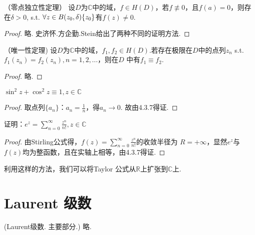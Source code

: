 \begin{mypro}\color{blue}（零点独立性定理）
	\color{black}
	设$\displaystyle{D}$为$\displaystyle{\mathbb{C}}$中的域，$\displaystyle{f \in H(D)}$，若$\displaystyle{f \not\equiv 0}$，且$\displaystyle{f(a)=0}$，则存在$\displaystyle{\delta > 0}$, s.t. $\displaystyle{\forall z \in B(z_0, \delta) \\ \{z_0\}}$有$\displaystyle{f(z) \neq 0}$.
\end{mypro}
\begin{proof}
	略. 史济怀.方企勤.Stein给出了两种不同的证明方法.
\end{proof}


\begin{mypro}\color{blue}（唯一性定理)
	\color{black}
	设$\displaystyle{D}$为$\displaystyle{\mathbb{C}}$中的域，$\displaystyle{f_1,f_2 \in H(D)}$.若存在极限在$\displaystyle{D}$中的点列$\displaystyle{z_n}$ s.t. $\displaystyle{f_1(z_n) = f_2(z_n), n=1,2,...}$，则在$\displaystyle{D}$ 中有$\displaystyle{f_1 \equiv f_2}$.
	
\end{mypro}
\begin{proof}
	略.
\end{proof}


\begin{eg} 
	\color{blue} $\displaystyle{{\sin}^2 z + \cos^2 z \equiv 1, z \in \mathbb{C}}$
	\color{black}
\end{eg}
\begin{proof}
	取点列$\displaystyle{\{a_n\}}$：$\displaystyle{a_n = \frac{1}{n}}$，得$\displaystyle{a_n \rightarrow 0}$. 故由4.3.7得证.
\end{proof}

\begin{eg}
	\color{blue}
	证明：$\displaystyle{e^z =\sum_{n=0}^{\infty} \frac{z^n}{n!}, z \in \mathbb{C}}$
	\color{black}
\end{eg}
\begin{proof}
	由Stirling公式得，$\displaystyle{f(z)=\sum_{n=0}^{\infty} \frac{z^n}{n!}}$的收敛半径为 $\displaystyle{R=+\infty}$，显然$\displaystyle{e^z}$与$\displaystyle{f(z)}$均为整函数，且在实轴上相等，由4.3.7得证.
\end{proof}
利用这样的方法，我们可以将{\rm Taylor }公式从$\displaystyle{\mathbb{R}}$上扩张到$\displaystyle{\mathbb{C}}$上.

\section{{\rm Laurent } 级数}
\begin{mypro}({\rm Laurent}级数. 主要部分.)
	略.
\end{mypro}

